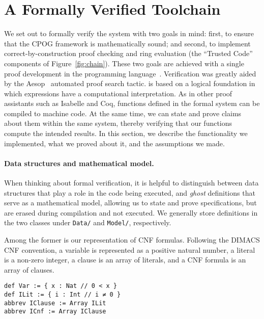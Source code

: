 
\section{A Formally Verified Toolchain}
\label{sect:formally-verified-toolchain}
\label{sect:lean:subtle-condition}

We set out to formally verify the system with two goals in mind:
first, to ensure that the CPOG framework is mathematically sound;
and second, to implement correct-by-construction proof checking
and ring evaluation (the ``Trusted Code'' components of Figure~\ref{fig:chain}).
These two goals are achieved with a single proof development
in the \lean{} programming language~\cite{demoura:cade:2021}.
Verification was greatly aided
by the Aesop~\cite{23limperg_aesop_white_box_best_first_proof_search_lean}
automated proof search tactic.
\lean{} is based on a logical foundation
in which expressions have a computational interpretation.
As in other proof assistants such as Isabelle and Coq,
functions defined in the formal system
can be compiled to machine code.
At the same time,
we can state and prove claims about them within the same system,
thereby verifying that our functions compute the intended results.
In this section,
we describe the functionality we implemented,
what we proved about it,
and the assumptions we made.

\paragraph{Data structures and mathematical model.}
When thinking about formal verification,
it is helpful to distinguish between data structures
that play a role in the code being executed,
and \emph{ghost} definitions that serve as a mathematical model,
allowing us to state and prove specifications,
but are erased during compilation and not executed.
We generally store definitions in the two classes
under {\tt Data/} and {\tt Model/},
respectively.

Among the former is our representation of CNF formulas.
Following the DIMACS CNF convention,
a variable is represented as a positive natural number,
a literal is a non-zero integer,
a clause is an array of literals,
and a CNF formula is an array of clauses.
\begin{lstlisting}
def Var := { x : Nat // 0 < x }
def ILit := { i : Int // i ≠ 0 }
abbrev IClause := Array ILit
abbrev ICnf := Array IClause
\end{lstlisting}

